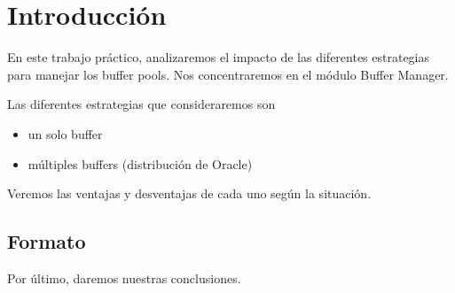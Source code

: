\section{Introducci\'on}

En este trabajo pr\'actico, analizaremos el impacto de las diferentes
estrategias para manejar los buffer pools.
Nos concentraremos en el m\'odulo Buffer Manager.

\vspace*{0.3cm}

Las diferentes estrategias que consideraremos son

\begin{itemize}
    \item
            un solo buffer
    \item
            múltiples buffers (distribución de Oracle)    
\end{itemize}

\vspace*{0.3cm}

Veremos las ventajas y desventajas de cada uno seg\'un la situaci\'on.

\subsection{Formato}


Por \'ultimo, daremos nuestras conclusiones.

